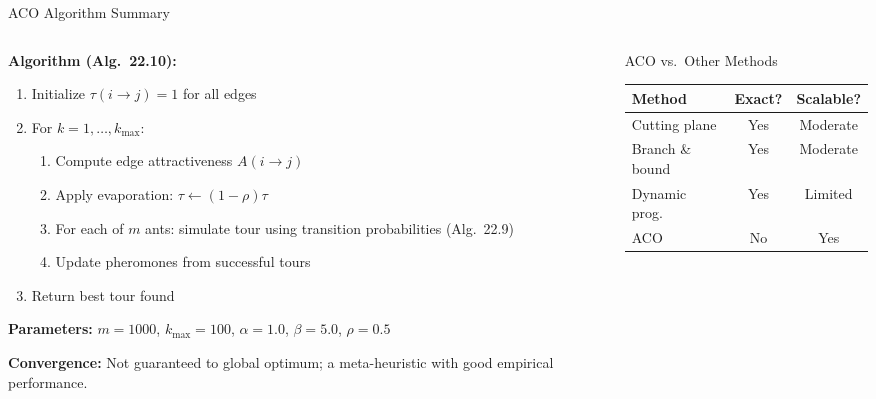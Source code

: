 \documentclass[aspectratio=169,10pt]{beamer}
\begin{document}
\begin{frame}{ACO Algorithm Summary}
  \begin{columns}
    \begin{column}{0.58\textwidth}
      \textbf{Algorithm (Alg.\ 22.10):}
      \begin{enumerate}
        \item Initialize $\tau(i \to j) = 1$ for all edges
        \item For $k = 1, \ldots, k_{\max}$:
          \begin{enumerate}
            \item Compute edge attractiveness $A(i \to j)$
            \item Apply evaporation: $\tau \leftarrow (1-\rho)\tau$
            \item For each of $m$ ants: simulate tour using
                  transition probabilities (Alg.\ 22.9)
            \item Update pheromones from successful tours
          \end{enumerate}
        \item Return best tour found
      \end{enumerate}

      \vspace{4pt}
      \textbf{Parameters:} $m = 1000$, $k_{\max} = 100$,
      $\alpha = 1.0$, $\beta = 5.0$, $\rho = 0.5$

      \vspace{4pt}
      \textbf{Convergence:} Not guaranteed to global optimum; a
      meta-heuristic with good empirical performance.
    \end{column}
    \begin{column}{0.40\textwidth}
      \begin{block}{ACO vs.\ Other Methods}
        \begin{tabular}{lcc}
          \toprule
          Method & Exact? & Scalable? \\
          \midrule
          Cutting plane & Yes & Moderate \\
          Branch \& bound & Yes & Moderate \\
          Dynamic prog. & Yes & Limited \\
          ACO & No & Yes \\
          \bottomrule
        \end{tabular}
      \end{block}
    \end{column}
  \end{columns}
\end{frame}
\end{document}
